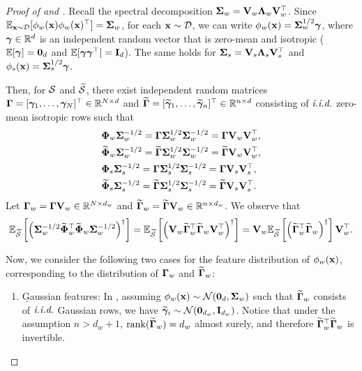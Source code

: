 \begin{proof}[Proof of  and ]
    Recall the spectral decomposition $\Sigmab_w = \Vb_w \Lambdab_w \Vb_w^\top$. 
    Since $\E_{\xb \sim \Dcal}[\phi_w(\xb) \phi_w(\xb)^\top] = \Sigmab_w$, for each $\xb \sim \Dcal$, we can write $\phi_w(\xb) = \Sigmab_w^{1/2} \gammab$, where $\gammab \in \R^{d}$ is an independent random vector that is zero-mean and isotropic (\ie $\E[\gammab] = \b0_{d}$ and $\E[\gammab \gammab^\top] = \Ib_{d}$). The same holds for $\Sigmab_s = \Vb_s \Lambdab_s \Vb_s^\top$ and $\phi_s(\xb) = \Sigmab_s^{1/2} \gammab$.

    Then, for $\Scal$ and $\wt\Scal$, there exist independent random matrices $\Gammab = [\gammab_1, \ldots, \gammab_N]^\top \in \R^{N \times d}$ and $\wt\Gammab = [\wt\gammab_1, \ldots, \wt\gammab_n]^\top \in \R^{n \times d}$ consisting of $\iid$ zero-mean isotropic rows such that
    \begin{align}\label{eq:pf_var_w2s_subgaussian_asm}
    \begin{split}
        &\Phib_w \Sigmab_w^{-1/2} = \Gammab \Sigmab_w^{1/2} \Sigmab_w^{-1/2} = \Gammab \Vb_w \Vb_w^\top, \\
        &\wt\Phib_w \Sigmab_w^{-1/2} = \wt\Gammab \Sigmab_w^{1/2} \Sigmab_w^{-1/2} = \wt\Gammab \Vb_w \Vb_w^\top, \\
        &\Phib_s \Sigmab_s^{-1/2} = \Gammab \Sigmab_s^{1/2} \Sigmab_s^{-1/2} = \Gammab \Vb_s \Vb_s^\top, \\
        &\wt\Phib_s \Sigmab_s^{-1/2} = \wt\Gammab \Sigmab_s^{1/2} \Sigmab_s^{-1/2} = \wt\Gammab \Vb_s \Vb_s^\top.
    \end{split}
    \end{align}
    Let $\Gammab_w = \Gammab \Vb_w \in \R^{N \times d_w}$ and $\wt\Gammab_w = \wt\Gammab \Vb_w \in \R^{n \times d_w}$. We observe that
    \begin{align*}
        \E_{\wt\Scal}\sbr{\rbr{\Sigmab_w^{-1/2} \wt\Phib_w^\top \wt\Phib_w \Sigmab_w^{-1/2}}^\dagger}
        = \E_{\wt\Scal}\sbr{\rbr{\Vb_w \wt\Gammab_w^\top \wt\Gammab_w \Vb_w^\top}^\dagger} 
        = \Vb_w \E_{\wt\Scal}\sbr{\rbr{\wt\Gammab_w^\top \wt\Gammab_w}^\dagger} \Vb_w^\top.
    \end{align*}

    Now, we consider the following two cases for the feature distribution of $\phi_w(\xb)$, corresponding to the distribution of $\Gammab_w$ and $\wt\Gammab_w$:
    \begin{enumerate}[label=(\alph*)]
        \item \b{Gaussian features}: In , assuming $\phi_w(\xb) \sim \Ncal(\b0_d, \Sigmab_w)$ such that $\wt\Gammab_w$ consists of $\iid$ Gaussian rows, we have $\wt\gammab_i \sim \Ncal(\b0_{d_w}, \Ib_{d_w})$. Notice that under the assumption $n > d_w + 1$, $\rank(\wt\Gammab_w) = d_w$ almost surely, and therefore $\wt\Gammab_w^\top \wt\Gammab_w$ is invertible.
        

\end{enumerate}
\end{proof}
